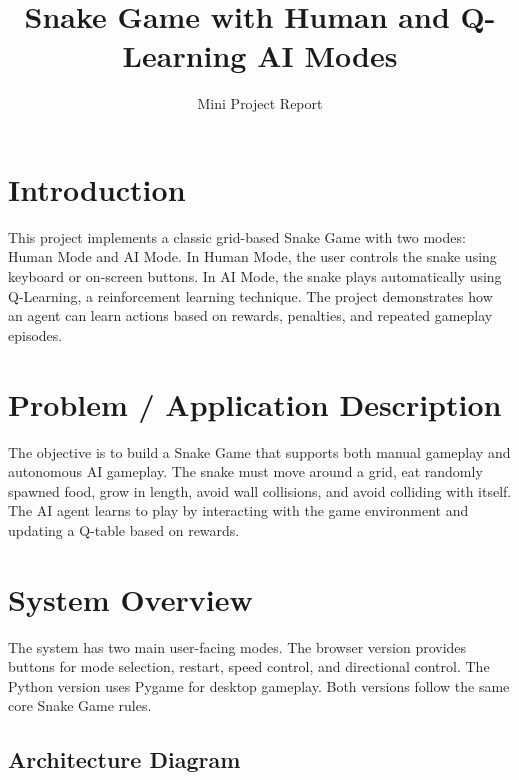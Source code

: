 \documentclass[12pt,a4paper]{article}
\title{\textbf{Snake Game with Human and Q-Learning AI Modes}}
\author{Mini Project Report}
\date{}
\begin{document}
\maketitle

\section{Introduction}

This project implements a classic grid-based Snake Game with two modes: Human Mode and AI Mode. In Human Mode, the user controls the snake using keyboard or on-screen buttons. In AI Mode, the snake plays automatically using Q-Learning, a reinforcement learning technique. The project demonstrates how an agent can learn actions based on rewards, penalties, and repeated gameplay episodes.

\section{Problem / Application Description}

The objective is to build a Snake Game that supports both manual gameplay and autonomous AI gameplay. The snake must move around a grid, eat randomly spawned food, grow in length, avoid wall collisions, and avoid colliding with itself. The AI agent learns to play by interacting with the game environment and updating a Q-table based on rewards.

\section{System Overview}

The system has two main user-facing modes. The browser version provides buttons for mode selection, restart, speed control, and directional control. The Python version uses Pygame for desktop gameplay. Both versions follow the same core Snake Game rules.

\subsection{Architecture Diagram}
\end{document}
